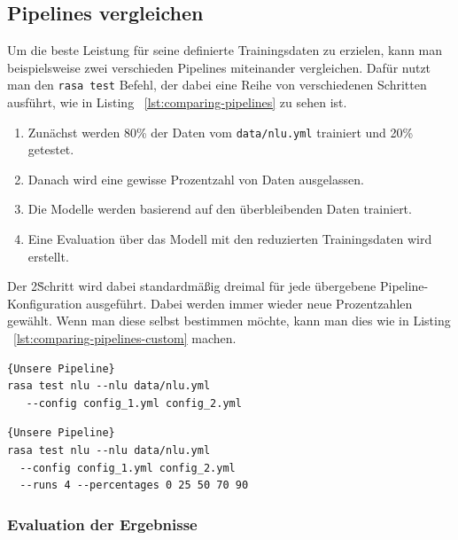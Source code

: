 \subsection{Pipelines vergleichen}\label{subsec:comparing-pipelines}

Um die beste Leistung für seine definierte Trainingsdaten zu erzielen, kann man beispielsweise zwei verschieden Pipelines miteinander vergleichen.
Dafür nutzt man den \texttt{rasa test} Befehl, der dabei eine Reihe von verschiedenen Schritten ausführt, wie in Listing ~\ref{lst:comparing-pipelines} zu sehen ist.

\begin{enumerate}
    \item Zunächst werden 80\% der Daten vom \texttt{data/nlu.yml} trainiert und 20\% getestet.
    \item Danach wird eine gewisse Prozentzahl von Daten ausgelassen.
    \item Die Modelle werden basierend auf den überbleibenden Daten trainiert.
    \item Eine Evaluation über das Modell mit den reduzierten Trainingsdaten wird erstellt.\cite{comparingNLUPipelines}
\end{enumerate}

Der 2\. Schritt wird dabei standardmäßig dreimal für jede übergebene Pipeline-Konfiguration ausgeführt.
Dabei werden immer wieder neue Prozentzahlen gewählt.
Wenn man diese selbst bestimmen möchte, kann man dies wie in Listing ~\ref{lst:comparing-pipelines-custom} machen.\cite{comparingNLUPipelines}

\begin{lstlisting}[label={lst:comparing-pipelines},caption={Unsere Pipeline}]{Unsere Pipeline}
rasa test nlu --nlu data/nlu.yml
   --config config_1.yml config_2.yml
\end{lstlisting}

\begin{lstlisting}[label={lst:comparing-pipelines-custom},caption={Unsere Pipeline}]{Unsere Pipeline}
rasa test nlu --nlu data/nlu.yml
  --config config_1.yml config_2.yml
  --runs 4 --percentages 0 25 50 70 90
\end{lstlisting}

\subsubsection{Evaluation der Ergebnisse}\label{subsubsec:evaluation-results}

